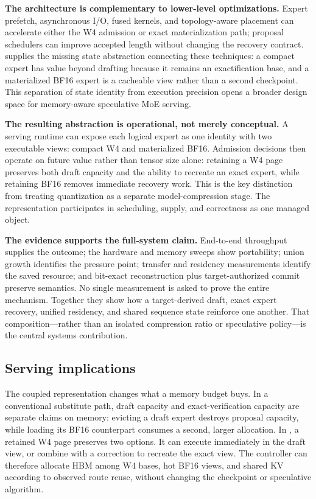 \textbf{The architecture is complementary to lower-level optimizations.} Expert
prefetch, asynchronous I/O, fused kernels, and topology-aware placement can accelerate
either the W4 admission or exact materialization path; proposal schedulers can improve
accepted length without changing the recovery contract. \system supplies the missing
state abstraction connecting these techniques: a compact expert has value beyond
drafting because it remains an exactification base, and a materialized BF16 expert is
a cacheable view rather than a second checkpoint. This separation of state identity
from execution precision opens a broader design space for memory-aware speculative
MoE serving.

\textbf{The resulting abstraction is operational, not merely conceptual.} A serving
runtime can expose each logical expert as one identity with two executable views:
compact W4 and materialized BF16. Admission decisions then operate on future value
rather than tensor size alone: retaining a W4 page preserves both draft capacity and
the ability to recreate an exact expert, while retaining BF16 removes immediate
recovery work. This is the key distinction from treating quantization as a separate
model-compression stage. The representation participates in scheduling, supply, and
correctness as one managed object.

\textbf{The evidence supports the full-system claim.} End-to-end throughput supplies
the outcome; the hardware and memory sweeps show portability; union growth identifies
the pressure point; transfer and residency measurements identify the saved resource;
and bit-exact reconstruction plus target-authorized commit preserve semantics. No
single measurement is asked to prove the entire mechanism. Together they show how a
target-derived draft, exact expert recovery, unified residency, and shared sequence
state reinforce one another. That composition---rather than an isolated compression
ratio or speculative policy---is the central systems contribution.

\FloatBarrier

\subsection{Serving implications}

The coupled representation changes what a memory budget buys. In a conventional
substitute path, draft capacity and exact-verification capacity are separate claims
on memory: evicting a draft expert destroys proposal capacity, while loading its
BF16 counterpart consumes a second, larger allocation. In \system, a retained W4
page preserves two options. It can execute immediately in the draft view, or combine
with a correction to recreate the exact view. The controller can therefore allocate
HBM among W4 bases, hot BF16 views, and shared KV according to observed route reuse,
without changing the checkpoint or speculative algorithm.

